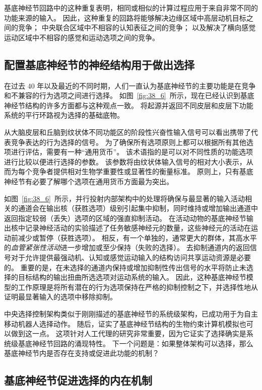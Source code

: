 基底神经节回路中的这种重复表明，相同或相似的计算过程应用于来自非常不同的功能来源的输入。
因此，这种重复的回路将能够解决边缘区域中高层动机目标之间的竞争；
中央联合区域中不相容的认知表征之间的竞争；
以及解决了横向感觉运动区域中不相容的感觉和运动选项之间的竞争。



\subsection{配置基底神经节的神经结构用于做出选择}

在过去 40 年以及最近的不同时期，人们一直认为基底神经节的主要功能是在竞争和不兼容的行为选项之间进行选择。
如图~\ref{fig:38_6}~所示，现在已经认识到基底神经节结构的许多方面都与这种观点一致。
将起源并返回不同皮层和皮层下功能系统的平行环路视为选择的基础底物。


从大脑皮层和丘脑到纹状体不同功能区的阶段性兴奋性输入信号可以看出携带了代表竞争表达的行为选择的信号。
为了确保所有选项原则上都可以根据所有其他选项进行评估，需要有一种“通用货币”。
该术语指的是可以对不同性质的功能选项进行比较以便进行选择的参数。
该参数将由纹状体输入信号的相对大小表示，从而为每个竞争者提供相对生物学重要性或显著性的衡量标准。
原则上，只有基底神经节有必要了解哪个选项在通用货币方面最为突出。


如图~\ref{fig:38_6}~所示，并行投射内部架构中的处理将确保与最显著的输入活动相关的通道会在输出核（获胜选项）级别引起集中抑制，同时维持或增加输出通道中返回指定较弱（丢失）选项的区域的强直抑制活动。
在活动动物的基底神经节输出核中记录神经活动的实验描述了任务敏感神经元的数量，这些神经元的活动在运动前减少或暂停（获胜选项）。
相反，有一个单独的，通常更大的群体，其高水平的\textit{血管紧张性活动}进一步增加或至少保持（失败的选择）。
去抑制通道内的返回信号对于允许提供最强动机、认知或感觉运动输入的结构访问共享运动资源是必要的。
重要的是，在未选择的通道内保持或增加抑制性传出信号的水平将防止未选择的目标结构的输出扭曲所选选项对运动系统的输入。
因此，这种基底神经节模型的工作原理是将所有潜在的行为选项保持在严格的抑制控制之下，并选择性地从证明最显著输入的选项中移除抑制。


中央选择控制架构类似于刚刚描述的基底神经节的系统级架构，已成功用于为自主移动机器人选择动作。
随后，证实了基底神经节结构的生物约束计算机模拟也可以做到这一点。
这项针对人工代理的研究非常重要，因为它证实了选择确实是系统级基底神经节回路的涌现特性。
下一个问题是：如果整体架构可以选择，那么基底神经节内是否存在支持或促进此功能的机制？


\subsection{基底神经节促进选择的内在机制}

